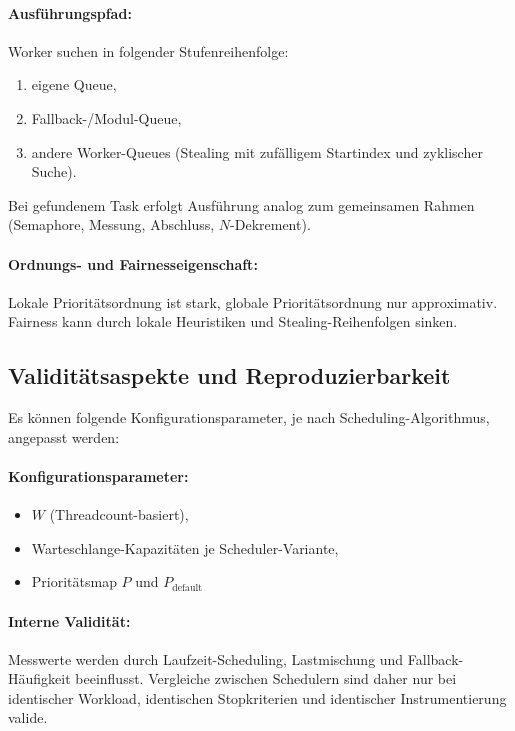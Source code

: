 \begin{sloppypar}
\paragraph{Ausführungspfad:}
Worker suchen in folgender Stufenreihenfolge:
\begin{enumerate}
\item eigene Queue,
\item Fallback-/Modul-Queue,
\item andere Worker-Queues (Stealing mit zufälligem Startindex und zyklischer Suche).
\end{enumerate}
Bei gefundenem Task erfolgt Ausführung analog zum gemeinsamen Rahmen (Semaphore, Messung, Abschluss, $N$-Dekrement).

\paragraph{Ordnungs- und Fairnesseigenschaft:}
Lokale Prioritätsordnung ist stark, globale Prioritätsordnung nur approximativ.
Fairness kann durch lokale Heuristiken und Stealing-Reihenfolgen sinken.

\subsection{Validitätsaspekte und Reproduzierbarkeit}
Es können folgende Konfigurationsparameter, je nach Scheduling-Algorithmus, angepasst werden:

\paragraph{Konfigurationsparameter:}
\begin{itemize}
\item $W$ (Threadcount-basiert),
\item Warteschlange-Kapazitäten je Scheduler-Variante,
\item Prioritätsmap $P$ und $P_{\mathrm{default}}$
\end{itemize}

\paragraph{Interne Validität:}
Messwerte werden durch Laufzeit-Scheduling, Lastmischung und Fallback-Häufigkeit beeinflusst.
Vergleiche zwischen Schedulern sind daher nur bei identischer Workload, identischen Stopkriterien und identischer Instrumentierung valide.


\end{sloppypar}
